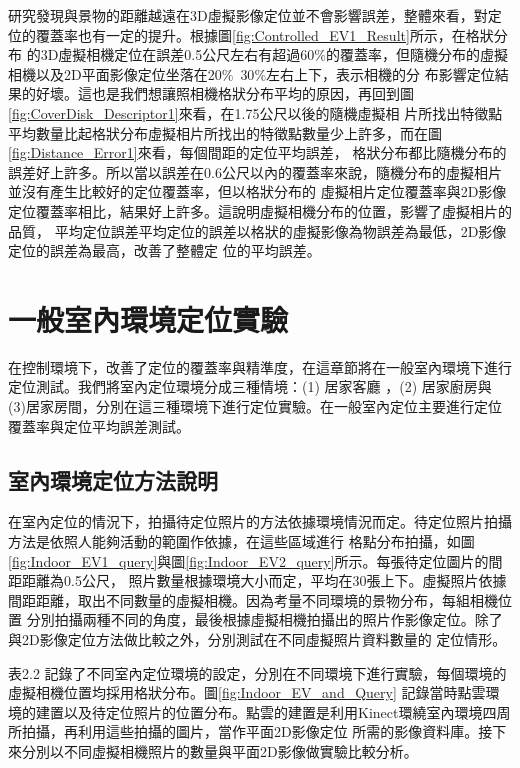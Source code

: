 	研究發現與景物的距離越遠在3D虛擬影像定位並不會影響誤差，整體來看，對定位的覆蓋率也有一定的提升。根據圖\ref{fig:Controlled_EV1_Result}所示，在格狀分布
的3D虛擬相機定位在誤差0.5公尺左右有超過$60\%$的覆蓋率，但隨機分布的虛擬相機以及2D平面影像定位坐落在$20\%$~$30\%$左右上下，表示相機的分
布影響定位結果的好壞。這也是我們想讓照相機格狀分布平均的原因，再回到圖\ref{fig:CoverDisk_Descriptor1}來看，在1.75公尺以後的隨機虛擬相
片所找出特徵點平均數量比起格狀分布虛擬相片所找出的特徵點數量少上許多，而在圖\ref{fig:Distance_Error1}來看，每個間距的定位平均誤差，
格狀分布都比隨機分布的誤差好上許多。所以當以誤差在0.6公尺以內的覆蓋率來說，隨機分布的虛擬相片並沒有產生比較好的定位覆蓋率，但以格狀分布的
虛擬相片定位覆蓋率與2D影像定位覆蓋率相比，結果好上許多。這說明虛擬相機分布的位置，影響了虛擬相片的品質，
平均定位誤差平均定位的誤差以格狀的虛擬影像為物誤差為最低，2D影像定位的誤差為最高，改善了整體定
位的平均誤差。

	
\section{一般室內環境定位實驗}

	在控制環境下，改善了定位的覆蓋率與精準度，在這章節將在一般室內環境下進行定位測試。我們將室內定位環境分成三種情境：(1)
居家客廳 ，(2) 居家廚房與 (3)居家房間，分別在這三種環境下進行定位實驗。在一般室內定位主要進行定位覆蓋率與定位平均誤差測試。
	
\subsection{室內環境定位方法說明}
	
	在室內定位的情況下，拍攝待定位照片的方法依據環境情況而定。待定位照片拍攝方法是依照人能夠活動的範圍作依據，在這些區域進行
格點分布拍攝，如圖\ref{fig:Indoor_EV1_query}與圖\ref{fig:Indoor_EV2_query}所示。每張待定位圖片的間距距離為0.5公尺，
照片數量根據環境大小而定，平均在30張上下。虛擬照片依據間距距離，取出不同數量的虛擬相機。因為考量不同環境的景物分布，每組相機位置
分別拍攝兩種不同的角度，最後根據虛擬相機拍攝出的照片作影像定位。除了與2D影像定位方法做比較之外，分別測試在不同虛擬照片資料數量的
定位情形。
		
	
	
	表2.2 記錄了不同室內定位環境的設定，分別在不同環境下進行實驗，每個環境的虛擬相機位置均採用格狀分布。圖\ref{fig:Indoor_EV_and_Query}
記錄當時點雲環境的建置以及待定位照片的位置分布。點雲的建置是利用Kinect環繞室內環境四周所拍攝，再利用這些拍攝的圖片，當作平面2D影像定位
所需的影像資料庫。接下來分別以不同虛擬相機照片的數量與平面2D影像做實驗比較分析。
	
